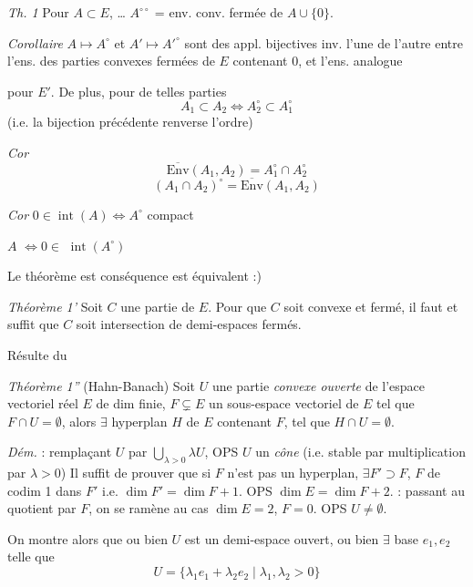 \documentclass[11pt,a4paper]{article}
\begin{document}
\emph{Th. 1} Pour $A \subset E$, … $A^{\circ\circ}$ = env. conv. fermée
de $A \cup \{0\}$.

\emph{Corollaire} $A \mapsto A^\circ$ et $A' \mapsto A'^\circ$ sont des appl.
bijectives inv. l'une de l'autre entre l'ens. des parties convexes fermées de
$E$ contenant $0$, et l'ens. analogue


pour $E'$.  De plus, pour de telles parties
\[
  A_1 \subset A_2 \Longleftrightarrow A_2^\circ \subset A_1^\circ
\]
(i.e. la bijection précédente renverse l'ordre)

\emph{Cor}
\[
  \overline{\mathrm{Env}}(A_1, A_2) = A_1^\circ \cap A_2^\circ
\]
\[
  (A_1 \cap A_2)^\circ = \overline{\mathrm{Env}}(A_1, A_2)
\]

\emph{Cor}  $0 \in \operatorname{int}(A) \Longleftrightarrow
A^\circ$ compact

$A$  $\Longleftrightarrow 0 \in$ \struck{\ill{}}
$\operatorname{int}(A^\circ)$

Le théorème est conséquence  \ill{} est équivalent :)

\emph{Théorème 1'} Soit $C$ une partie de $E$. Pour que $C$ soit convexe et
fermé, il faut et suffit que $C$ soit intersection de demi-espaces fermés.

Résulte du

\emph{Théorème 1''} (Hahn-Banach) Soit $U$ une partie \emph{convexe ouverte}
de l'espace vectoriel réel $E$ de dim finie, $F \subsetneq E$ un sous-espace
vectoriel de $E$ tel que $F \cap U = \emptyset$, alors $\exists$ hyperplan $H$
de $E$ contenant $F$, tel que $H \cap U = \emptyset$.


 \emph{Dém.} \ill{} : remplaçant $U$ par
$\bigcup_{\lambda > 0} \lambda U$, OPS $U$ un \emph{cône} (i.e. stable par
multiplication par $\lambda > 0$) Il suffit de prouver que si $F$ n'est pas
un hyperplan, $\exists F' \supset F$, $F$ de codim 1 dans $F'$ i.e.
$\dim F' = \dim F + 1$. OPS $\dim E = \dim F + 2$. \ill{} : passant au
quotient par $F$, on se ramène au cas $\dim E = 2$, $F = 0$. OPS
$U \neq \emptyset$.

On montre alors que ou bien $U$ est un demi-espace ouvert, ou bien $\exists$
base $e_1, e_2$ telle que
\[
  U = \{ \lambda_1 e_1 + \lambda_2 e_2 \mid \lambda_1, \lambda_2 > 0 \}
\]
\end{document}
